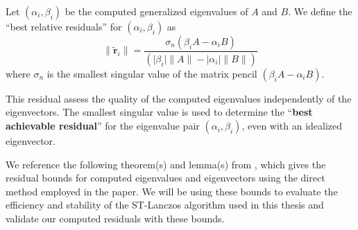 \begin{definition}\label{def:BestResidual}
	Let $(\alpha_i, \beta_i)$ be the computed generalized eigenvalues of $A$ and $B$. We define the ``best relative residuals'' for $(\alpha_i, \beta_i)$ as
	\begin{equation}\label{eq:BestResiduals}
		\|\tilde{\mathbf{r}}_i\| = \frac{\sigma_n(\beta_i A - \alpha_i B)}{(\lvert \beta_i \rvert \|A\| - \lvert \alpha_i \rvert \|B\|)}
	\end{equation}
 where $\sigma_n$ is the smallest singular value of the matrix pencil $(\beta_i A - \alpha_i B)$.
\end{definition}
This residual assess the quality of the computed eigenvalues independently of the eigenvectors. The smallest singular value is used to determine the ``\textbf{best achievable residual}'' for the eigenvalue pair $(\alpha_i, \beta_i)$, even with an idealized eigenvector.

We reference the following theorem(s) and lemma(s) from \cite{stewart2024spectraltransformationdensesymmetric}, which gives the residual bounds for computed eigenvalues and eigenvectors using the direct method employed in the paper.  We will be using these bounds to evaluate the efficiency and stability of the ST-Lanczos algorithm used in this thesis and validate our computed residuals with these bounds.


